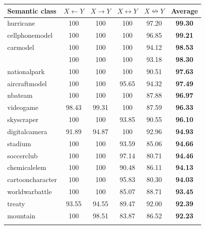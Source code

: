 {%
\begin{table}[h]
\tiny
\begin{center}
  \begin{tabular}{|l||c|c|c|c||c|}
    \hline
    \textbf{Semantic class}    & \textbf{$X \leftarrow Y$} & \textbf{$X \rightarrow Y$} & \textbf{$X \leftrightarrow Y$} & \textbf{$X \nleftrightarrow Y$} & \textbf{Average} \\
    \hline
    \hline
    hurricane         &    100  &    100  &    100  &  97.20  &  \textbf{99.30} \\
    cellphonemodel    &    100  &    100  &    100  &  96.85  &  \textbf{99.21} \\
    carmodel          &    100  &    100  &    100  &  94.12  &  \textbf{98.53} \\
\ignore{    searchengine      &    100  &    100  &    100  &  93.18  &  \textbf{98.30} \\
    nationalpark      &    100  &    100  &    100  &  90.51  &  \textbf{97.63} \\
    aircraftmodel     &    100  &    100  &  95.65  &  94.32  &  \textbf{97.49} \\
    nbateam           &    100  &    100  &    100  &  87.88  &  \textbf{96.97} \\
    videogame         &  98.43  &  99.31  &    100  &  87.59  &  \textbf{96.33} \\
    skyscraper        &    100  &    100  &  93.85  &  90.55  &  \textbf{96.10} \\
    digitalcamera     &  91.89  &  94.87  &    100  &  92.96  &  \textbf{94.93} \\
    stadium           &    100  &    100  &  93.59  &  85.06  &  \textbf{94.66} \\
    soccerclub        &    100  &    100  &  97.14  &  80.71  &  \textbf{94.46} \\
    chemicalelem      &    100  &    100  &  90.48  &  86.11  &  \textbf{94.13} \\
    cartooncharacter  &    100  &    100  &  95.83  &  80.30  &  \textbf{94.03} \\
    worldwarbattle    &    100  &    100  &  85.07  &  88.71  &  \textbf{93.45} \\
    treaty            &  93.55  &  94.55  &  89.47  &  92.00  &  \textbf{92.39} \\
    mountain          &    100  &  98.51  &  83.87  &  86.52  &  \textbf{92.23} \\
}
\end{tabular}
\end{center}
\end{table}}
